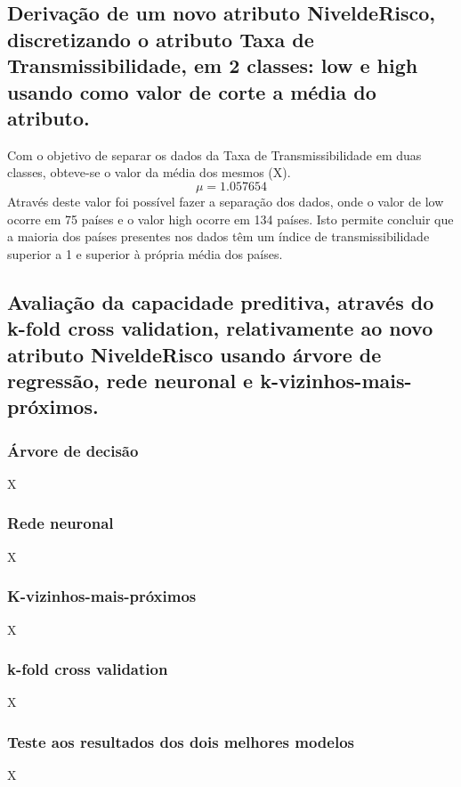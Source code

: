 \documentclass[conference]{IEEEtran}
\begin{document}
\subsection{Derivação de um novo atributo NiveldeRisco, discretizando o atributo Taxa de Transmissibilidade, em 2 classes: low e high usando como valor de corte a média do atributo.}
\label{ex05}
Com o objetivo de separar os dados da Taxa de Transmissibilidade em duas classes, obteve-se o valor da média dos mesmos (X).
\begin{equation}
\mu = 1.057654\label{4_ttest}
\end{equation}
Através deste valor foi possível fazer a separação dos dados, onde o valor de low ocorre em 75 países e o valor high ocorre em 134 países. Isto permite concluir que a maioria dos países presentes nos dados têm um índice de transmissibilidade superior a 1 e superior à própria média dos países.


\subsection{Avaliação da capacidade preditiva, através do k-fold cross validation, relativamente ao novo atributo NiveldeRisco usando árvore de regressão, rede neuronal e k-vizinhos-mais-próximos.}
\subsubsection{Árvore de decisão}
X


\subsubsection{Rede neuronal}
X


\subsubsection{K-vizinhos-mais-próximos}
X


\subsubsection{k-fold cross validation}
X

\subsubsection{Teste aos resultados dos dois melhores modelos}
X
\end{document}

